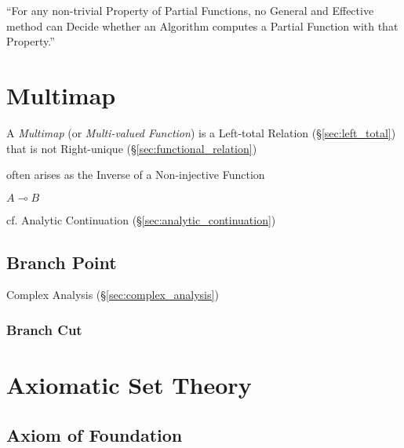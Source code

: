``For any non-trivial Property of Partial Functions, no General and
Effective method can Decide whether an Algorithm computes a Partial
Function with that Property.''



\section{Multimap}\label{sec:multimap}

A \emph{Multimap} (or \emph{Multi-valued Function}) is a Left-total
Relation (\S\ref{sec:left_total}) that is not Right-unique
(\S\ref{sec:functional_relation})

often arises as the Inverse of a Non-injective Function

$A \multimap B$

cf. Analytic Continuation (\S\ref{sec:analytic_continuation})



\subsection{Branch Point}\label{sec:branch_point}

Complex Analysis (\S\ref{sec:complex_analysis})



\subsubsection{Branch Cut}\label{sec:branch_cut}



\section{Axiomatic Set Theory}\label{sec:axiomatic_set_theory}

\subsection{Axiom of Foundation}\label{sec:foundation_axiom}

